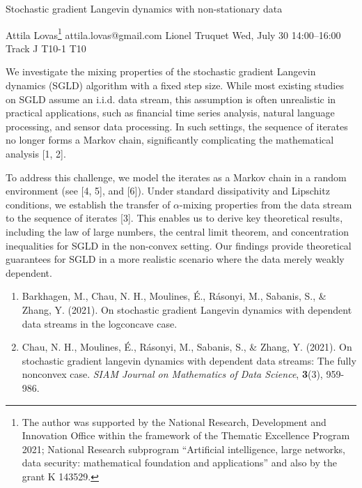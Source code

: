 \begin{talk}
  {Stochastic gradient Langevin dynamics with non-stationary data}%
  {Attila Lovas\footnote{The author was supported by the National Research, Development and Innovation Office within the framework of the Thematic Excellence Program 2021; National Research subprogram “Artificial intelligence, large networks, data security: mathematical foundation and applications” and also by the grant K 143529.}%
  {attila.lovas@gmail.com}%
  {Lionel Truquet}%
  {}%
  {}%
  {Wed, July 30 14:00–16:00 Track J}%
  {T10-1}%
  {T10}%
		
We investigate the mixing properties of the stochastic gradient Langevin dynamics (SGLD) algorithm with a fixed step size. While most existing studies on SGLD assume an i.i.d. data stream, this assumption is often unrealistic in practical applications, such as financial time series analysis, natural language processing, and sensor data processing. In such settings, the sequence of iterates no longer forms a Markov chain, significantly complicating the mathematical analysis [1, 2].

To address this challenge, we model the iterates as a Markov chain in a random environment (see [4, 5], and [6]). Under standard dissipativity and Lipschitz conditions, we establish the transfer of $\alpha$-mixing properties from the data stream to the sequence of iterates [3]. This enables us to derive key theoretical results, including the law of large numbers, the central limit theorem, and concentration inequalities for SGLD in the non-convex setting. Our findings provide theoretical guarantees for SGLD in a more realistic scenario where the data merely weakly dependent.
		
\medskip

\begin{enumerate}
	
	\item[{[1]}] Barkhagen, M., Chau, N. H., Moulines, \'E., R\'asonyi, M., Sabanis, S., \& Zhang, Y. (2021). On stochastic gradient Langevin dynamics with dependent data streams in the logconcave case.
	
	\item[{[2]}] Chau, N. H., Moulines, \'E., R\'asonyi, M., Sabanis, S., \& Zhang, Y. (2021). On stochastic gradient langevin dynamics with dependent data streams: The fully nonconvex case. {\it SIAM Journal on Mathematics of Data Science}, \textbf{3}(3), 959-986.
	

\end{enumerate}}
\end{talk}
